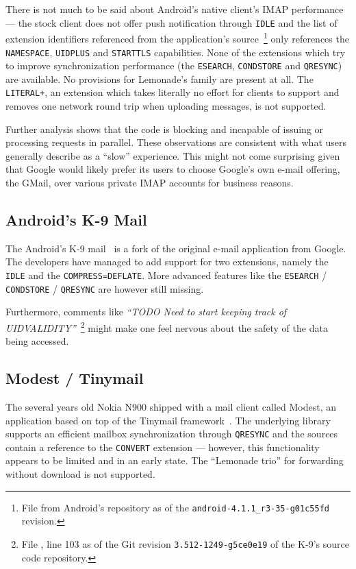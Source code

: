\documentclass[trojita]{subfiles}
\begin{document}
There is not much to be said about Android's native client's IMAP performance --- the stock client does not offer push
notification through {\tt IDLE} \cite{android-idle} and the list of extension identifiers referenced from the
application's source~\footnote{File  from Android's
 repository as of the {\tt android-4.1.1\_r3-35-g01c55fd} revision.} only references
the {\tt NAMESPACE}, {\tt UIDPLUS} and {\tt STARTTLS} capabilities.  None of the extensions which try to improve
synchronization performance (the {\tt ESEARCH}, {\tt CONDSTORE} and {\tt QRESYNC}) are available.  No provisions for
Lemonade's family are present at all.  The {\tt LITERAL+}, an extension which takes literally no effort for clients to
support and removes one network round trip when uploading messages, is not supported.

Further analysis shows that the code is blocking and incapable of issuing or processing requests in parallel.  These
observations are consistent with what users generally describe as a ``slow'' experience.  This might not come surprising
given that Google would likely prefer its users to choose Google's own e-mail offering, the GMail, over various private
IMAP accounts for business reasons.

\subsection{Android's K-9 Mail}

The Android's K-9 mail~\cite{k9mail} is a fork of the original e-mail application from Google.  The developers have
managed to add support for two extensions, namely the {\tt IDLE} and the {\tt COMPRESS=DEFLATE}.  More advanced features
like the {\tt ESEARCH} / {\tt CONDSTORE} / {\tt QRESYNC} are however still missing.

Furthermore, comments like {\em ``TODO Need to start keeping track of UIDVALIDITY''}~\footnote{File
, line 103 as of the Git revision {\tt 3.512-1249-g5ce0e19} of the K-9's
source code repository.} might make one feel nervous about the safety of the data being accessed.

\subsection{Modest / Tinymail}

The several years old Nokia N900 shipped with a mail client called Modest, an application based on top of the Tinymail
framework~\cite{tinymail}.  The underlying library supports an efficient mailbox synchronization through {\tt QRESYNC}
and the sources contain a reference to the {\tt CONVERT} extension --- however, this functionality appears to be limited
and in an early state.  The ``Lemonade trio'' for forwarding without download is not supported.
\end{document}
